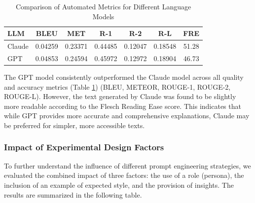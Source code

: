 \documentclass[preprint,12pt]{elsarticle}
\begin{document}
\begin{table}[h]
\centering
\label{table:llm_comparison}
\begin{tabular}{|l|c|c|c|c|c|c|}
\hline
\textbf{LLM}  & \textbf{BLEU} & \textbf{MET} & \textbf{R-1} & \textbf{R-2} & \textbf{R-L} & \textbf{FRE} \\
\hline
Claude & 0.04259 & 0.23371 & 0.44485 & 0.12047 & 0.18548 & 51.28 \\
GPT    & 0.04853 & 0.24594 & 0.45972 & 0.12972 & 0.18904 & 46.73 \\
\hline
\end{tabular}
\caption{Comparison of Automated Metrics for Different Language Models}
\end{table}

The GPT model consistently outperformed the Claude model across all quality and accuracy metrics (Table \ref{table:llm_comparison}) (BLEU, METEOR, ROUGE-1, ROUGE-2, ROUGE-L). However, the text generated by Claude was found to be slightly more readable according to the Flesch Reading Ease score. This indicates that while GPT provides more accurate and comprehensive explanations, Claude may be preferred for simpler, more accessible texts.

\subsubsection{Impact of Experimental Design Factors}

To further understand the influence of different prompt engineering strategies, we evaluated the combined impact of three factors: the use of a role (persona), the inclusion of an example of expected style, and the provision of insights. The results are summarized in the following table.
\end{document}
